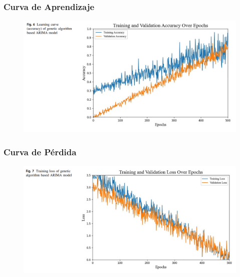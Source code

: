 \documentclass[aspectratio=1610]{beamer}
\begin{document}
\begin{frame}[fragile]
    \frametitle{Curva de Aprendizaje}
    \begin{figure}
        \centering
        \includegraphics[width=1\textwidth]{Opti-Imagenes/01-03.png}
    \end{figure}
\end{frame}



    
\begin{frame}[fragile]
    \frametitle{Curva de Pérdida}
    \begin{figure}
        \centering
        \includegraphics[width=1\textwidth]{Opti-Imagenes/01-04.png}
    \end{figure}
\end{frame}
\end{document}
